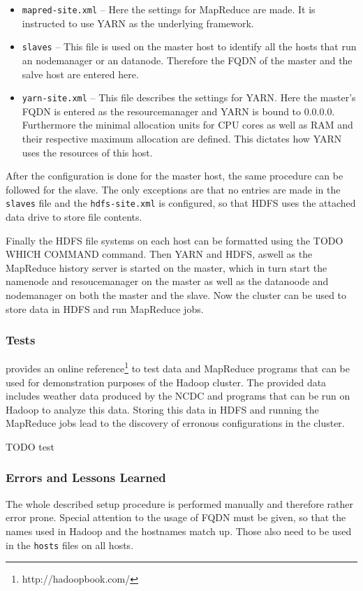 \begin{enumerate}
\begin{itemize}
        \item \texttt{mapred-site.xml} -- Here the settings for MapReduce are made. 
        It is instructed to use \ac{YARN} as the underlying framework.
        \item \texttt{slaves} -- This file is used on the master host to identify all the hosts 
        that run an nodemanager or an datanode.
        Therefore the \acs{FQDN} of the master and the salve host are entered here.
        \item \texttt{yarn-site.xml} -- This file describes the settings for \ac{YARN}. Here the master's \ac{FQDN} is entered as the resourcemanager and \ac{YARN} is bound to 0.0.0.0. 
        Furthermore the minimal allocation units for \ac{CPU} cores 
        as well as \ac{RAM} and their respective maximum allocation are defined. 
        This dictates how \ac{YARN} uses the resources of this host.
    \end{itemize}
\end{enumerate}

After the configuration is done for the master host, the same procedure can be followed for the slave. 
The only exceptions are that no entries are made in the \texttt{slaves} file 
and the \texttt{hdfs-site.xml} is configured, so that \ac{HDFS} uses the attached data drive to store file contents.

Finally the \ac{HDFS} file systems on each host can be formatted using the TODO WHICH COMMAND command.
Then \ac{YARN} and \ac{HDFS}, aswell as the MapReduce history server is started on the master, 
which in turn start the namenode and resoucemanager on the master 
as well as the datanoode and nodemanager on both the master and the slave.
Now the cluster can be used to store data in \ac{HDFS} and run MapReduce jobs.

\subsubsection{Tests}
\autocite[][]{white2015hadoop} provides an online reference\footnote{http://hadoopbook.com/} 
to test data and MapReduce programs 
that can be used for demonstration purposes of the Hadoop cluster.
The provided data includes weather data produced by the \ac{NCDC} and programs that can be run on Hadoop to analyze this data. 
Storing this data in \ac{HDFS} and running the MapReduce jobs lead to the discovery of erronous configurations in the cluster.

TODO test

\subsubsection{Errors and Lessons Learned}
The whole described setup procedure is performed manually 
and therefore rather error prone.
Special attention to the usage of \acs{FQDN} must be given, 
so that the names used in Hadoop and the hostnames match up.
Those also need to be used in the \texttt{hosts} files on all hosts.


